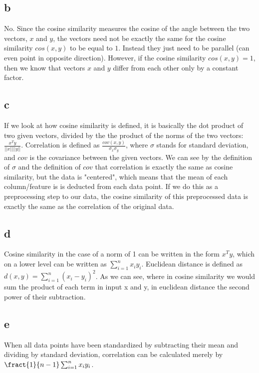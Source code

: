 \documentclass{article}
\begin{document}
\subsection{b}
No. Since the cosine similarity measures the cosine of the angle between the two vectors, $x$ and $y$, the vectors need not be exactly the same for the cosine similarity $cos(x,y)$ to be equal to $1$. Instead they just need to be parallel (can even point in opposite direction). However, if the cosine similarity $cos(x,y) = 1$, then we know that vectors $x$ and $y$ differ from each other only by a constant factor.

\subsection{c}
If we look at how cosine similarity is defined, it is basically the dot product of two given vectors, divided by the the product of the norms of the two vectors: $\frac{x^Ty}{||x|| ||y||}$. Correlation is defined as $\frac{cov(x, y)}{\sigma_x \sigma_y}$, where $\sigma$ stands for standard deviation, and $cov$ is the covariance between the given vectors. We can see by the definition of $\sigma$ and the definition of $cov$ that correlation is exactly the same as cosine similarity, but the data is "centered", which means that the mean of each column/feature is is deducted from each data point. If we do this as a preprocessing step to our data, the cosine similarity of this preprocessed data is exactly the same as the correlation of the original data. 

\subsection{d}
Cosine similarity in the case of a norm of 1 can be written in the form $x^T y$, which on a lower level can be written as $\sum_{i=1}^{n} x_i  y_i$. Euclidean distance is defined as $d(x,y) = \sum_{i=1}^{n} (x_i - y_i)^2$. As we can see, where in cosine similarity we would sum the product of each term in input x and y, in euclidean distance the second power of their subtraction. 

\subsection{e}
When all data points have been standardized by subtracting their mean and dividing by standard deviation, correlation can be calculated merely by $\fract{1}{n - 1} \sum_{i=1}^{n} x_i y_i$. 
\end{document}
